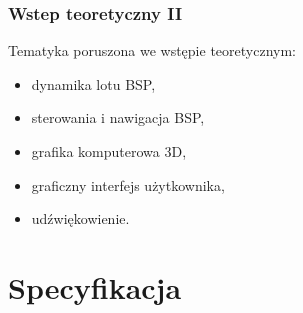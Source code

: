 \documentclass[aspectratio=169]{beamer}
\begin{document}
\begin{frame}%
	\frametitle{Wstep teoretyczny II}
	Tematyka poruszona we wstępie teoretycznym:
	\begin{itemize}
	  \item<2->{
	    dynamika lotu BSP,
	  }
	  \item<3-> {   
	    sterowania i nawigacja BSP,
	  }
	  \item<4-> {
	    grafika komputerowa 3D,
	  }
	  \item<5-> {
	    graficzny interfejs użytkownika,
	  }
	  \item<6->{
	    udźwiękowienie.
	  }
 	 \end{itemize}
\end{frame}




\section{Specyfikacja}
\end{document}
